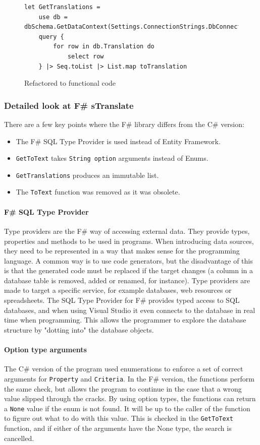 \documentclass[12pt, a4paper]{article}
\newcommand{\code}[1]{{\small \texttt{#1}}}
\begin{document}
\begin{figure}[!h]
\begin{lstlisting}
let GetTranslations =
    use db = dbSchema.GetDataContext(Settings.ConnectionStrings.DbConnectionString)
    query {
        for row in db.Translation do 
            select row
    } |> Seq.toList |> List.map toTranslation 
\end{lstlisting}
\caption{Refactored to functional code}
\end{figure}

\newpage


\subsubsection{Detailed look at F\# sTranslate}
There are a few key points where the F\# library differs from the C\# version:
\begin{itemize}
	\item The F\# SQL Type Provider is used instead of Entity Framework.
	\item \code{GetToText} takes \code{String option} arguments instead of Enums.
	\item \code{GetTranslations} produces an immutable list.
	\item The \code{ToText} function was removed as it was obsolete.
\end{itemize}

\paragraph{F\# SQL Type Provider} Type providers are the F\# way of accessing external data. They provide types, properties and methods to be used in programs. When introducing data sources, they need to be represented in a way that makes sense for the programming language. A common way is to use code generators, but the disadvantage of this is that the generated code must be replaced if the target changes (a column in a database table is removed, added or renamed, for instance). Type providers are made to target a specific service, for example databases, web resources or spreadsheets. The SQL Type Provider for F\# provides typed access to SQL databases, and when using Visual Studio it even connects to the database in real time when programming. This allows the programmer to explore the database structure by "dotting into" the database objects.

\paragraph{Option type arguments} The C\# version of the program used enumerations to enforce a set of correct arguments for \code{Property} and \code{Criteria}. In the F\# version, the functions perform the same check, but allows the program to continue in the case that a wrong value slipped through the cracks. By using option types, the functions can return a \code{None} value if the enum is not found. It will be up to the caller of the function to figure out what to do with this value. This is checked in the \code{GetToText} function, and if either of the arguments have the None type, the search is cancelled.
\end{document}
